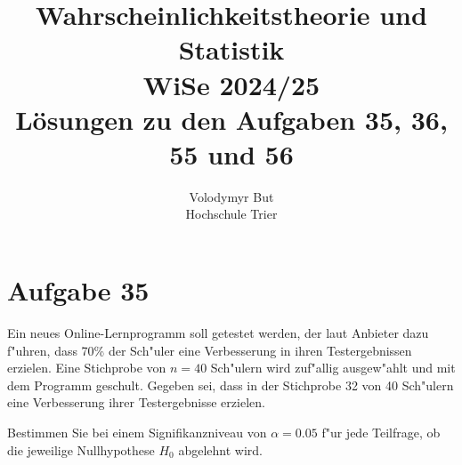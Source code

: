 \documentclass[10pt, oneside]{article}
\title{Wahrscheinlichkeitstheorie und Statistik\\[10pt]\Large{WiSe 2024/25}\\[15pt]\Large{L{\"o}sungen zu den Aufgaben 35, 36, 55 und 56}}
\author{Volodymyr But\\[10pt]Hochschule Trier}
\date{}
\begin{document}
\sloppy

\maketitle
\vspace{25px}

\section{Aufgabe 35}

Ein neues Online-Lernprogramm soll getestet werden, der laut Anbieter dazu
f"uhren, dass 70\% der Sch"uler eine Verbesserung in ihren Testergebnissen
erzielen. Eine Stichprobe von $n = 40$ Sch"ulern wird zuf"allig ausgew"ahlt und
mit dem Programm geschult. Gegeben sei, dass in der Stichprobe 32 von 40
Sch"ulern eine Verbesserung ihrer Testergebnisse erzielen.

Bestimmen Sie bei einem Signifikanzniveau von $\alpha = 0.05$ f"ur jede
Teilfrage, ob die jeweilige Nullhypothese $H_0$ abgelehnt wird.
\end{document}
